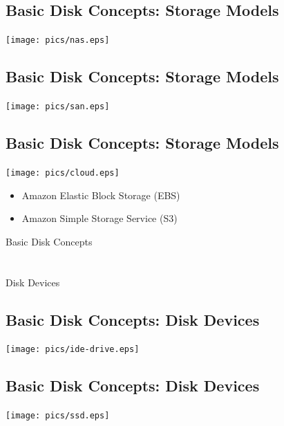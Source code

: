 \documentclass[xga]{xdvislides}
\begin{document}
\subsection{Basic Disk Concepts: Storage Models}
\begin{center}
	\texttt{[image: pics/nas.eps]} \\
\end{center}

\subsection{Basic Disk Concepts: Storage Models}
\begin{center}
	\texttt{[image: pics/san.eps]} \\
\end{center}

\subsection{Basic Disk Concepts: Storage Models}
\begin{center}
	\texttt{[image: pics/cloud.eps]} \\
\end{center}
\begin{itemize}
	\item Amazon Elastic Block Storage (EBS)
	\item Amazon Simple Storage Service (S3)
\end{itemize}


\newpage
\vspace*{\fill}
\begin{center}
	\Hugesize
		Basic Disk Concepts \\ [1em]
	\hspace*{5mm}
	\blueline\\
	\hspace*{5mm}\\
		Disk Devices
\end{center}
\vspace*{\fill}


\subsection{Basic Disk Concepts: Disk Devices}
	\begin{center}
		\texttt{[image: pics/ide-drive.eps]} \\
	\end{center}

\subsection{Basic Disk Concepts: Disk Devices}
	\begin{center}
		\texttt{[image: pics/ssd.eps]} \\
	\end{center}
\end{document}
